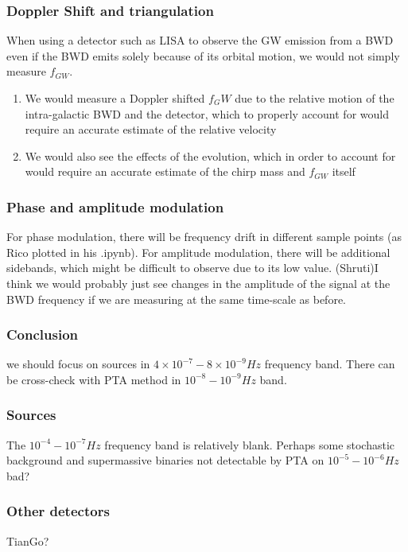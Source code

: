 \documentclass{article}
\begin{document}
\subsubsection*{Doppler Shift and triangulation}
When using a detector such as LISA to observe the GW emission from a BWD even if the BWD emits solely because of its orbital motion, we would not simply measure $f_{GW}$.
\begin{enumerate}
    \item We would measure a Doppler shifted $f_GW$ due to the relative motion of the intra-galactic BWD and the detector, which to properly account for would require an accurate estimate of the relative velocity
    \item We would also see the effects of the evolution, which in order to account for would require an accurate estimate of the chirp mass and $f_{GW}$ itself
\end{enumerate}


\subsubsection*{Phase and amplitude modulation}
For phase modulation, there will be frequency drift in different sample points (as Rico plotted in his .ipynb). For amplitude modulation, there will be additional sidebands, which might be difficult to observe due to its low value.
(Shruti)I think we would probably just see changes in the amplitude of the signal at the BWD frequency if we are measuring at the same time-scale as before.

\subsubsection*{Conclusion}
 we should focus on sources in $4\times10^{-7}-8\times10^{-9} Hz$ frequency band. There can be cross-check with PTA method in $10^{-8}-10^{-9} Hz$ band.



\subsubsection{Sources}

The $10^{-4}-10^{-7} Hz$ frequency band is relatively blank. Perhaps some stochastic background and supermassive binaries not detectable by PTA on $10^{-5}-10^{-6} Hz$ bad?

\subsubsection{Other detectors}
TianGo?\cite{Kevin2019}
\end{document}
